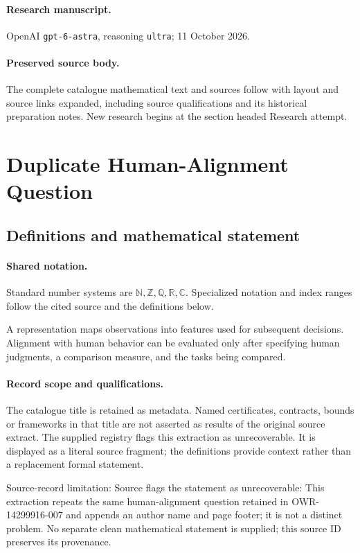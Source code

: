 \documentclass[11pt]{article}
\begin{document}
\paragraph{Research manuscript.} OpenAI \texttt{gpt-6-astra}, reasoning \texttt{ultra}; 11 October 2026.
\paragraph{Preserved source body.} The complete catalogue mathematical text and sources follow with layout and source links expanded, including source qualifications and its historical preparation notes. New research begins at the section headed Research attempt.

\section{Duplicate Human-Alignment Question}\label{statement}

\subsection{Definitions and mathematical statement}

\paragraph{Shared notation.}Standard number systems are $\mathbb N,\mathbb Z,\mathbb Q,\mathbb R,\mathbb C$. Specialized notation and index ranges follow the cited source and the definitions below.


A representation maps observations into features used for subsequent decisions. Alignment with human behavior can be evaluated only after specifying human judgments, a comparison measure, and the tasks being compared.
\paragraph{Record scope and qualifications.}
The catalogue title is retained as metadata. Named certificates, contracts, bounds or frameworks in that title are not asserted as results of the original source extract.
The supplied registry flags this extraction as unrecoverable. It is displayed as a literal source fragment; the definitions provide context rather than a replacement formal statement.

Source-record limitation: Source flags the statement as unrecoverable: This extraction repeats the same human-alignment question retained in OWR-14299916-007 and appends an author name and page footer; it is not a distinct problem. No separate clean mathematical statement is supplied; this source ID preserves its provenance.
\end{document}
